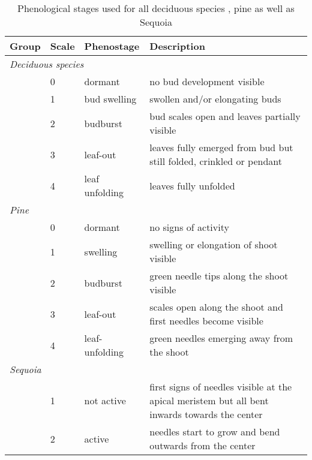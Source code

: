 \documentclass{article}
\begin{document}
		
		
			
\begin{table}[H]
	\captionsetup{justification=raggedright, singlelinecheck=false} %
	\centering
	\caption{Phenological stages used for all deciduous species \citep{vitasseElevationalAdaptationPlasticity2013a}, pine as well as Sequoia}
	\begin{tabular}{p{2.4cm} p{1cm} p{2.5cm} p{8.0cm}} %
		\toprule
		\textbf{Group} & \textbf{Scale} & \textbf{Phenostage} & \textbf{Description} \\
		\midrule
		
		\multicolumn{4}{l}{\textit{Deciduous species}} \\
		& 0 & dormant & no bud development visible \\
		& 1 & bud swelling & swollen and/or elongating buds \\
		& 2 & budburst & bud scales open and leaves partially visible \\
		& 3 & leaf-out & leaves fully emerged from bud but still folded, crinkled or pendant \\
		& 4 & leaf unfolding & leaves fully unfolded \\
		\midrule
		
		\multicolumn{4}{l}{\textit{Pine}} \\
		& 0 & dormant & no signs of activity \\
		& 1 & swelling & swelling or elongation of shoot visible \\
		& 2 & budburst & green needle tips along the shoot visible \\
		& 3 & leaf-out & scales open along the shoot and first needles become visible \\
		& 4 & leaf-unfolding & green needles emerging away from the shoot \\
		\midrule
		
		\multicolumn{4}{l}{\textit{Sequoia}} \\
		& 1 & not active & first signs of needles visible at the apical meristem but all bent inwards towards the center \\
		& 2 & active & needles start to grow and bend outwards from the center \\
		\bottomrule
	\end{tabular}
\end{table}


			
\end{document}
